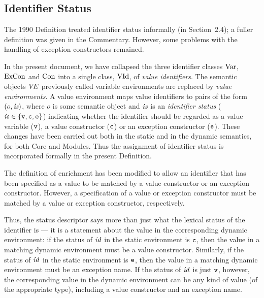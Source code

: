 \subsection{Identifier Status}
%
The 1990 Definition treated identifier status informally (in Section~2.4);
a fuller definition was
given in the Commentary\cite[Appendix B]{mt91}. However, some
problems with the handling of exception constructors remained\cite[Sect.~10.3]{kahrs93}.

In the present document, we have collapsed
the three identifier classes ${\rm Var}$, ${\rm ExCon}$ and ${\rm Con}$ into a single
class, ${\rm VId}$, of {\sl value identifiers}. 
The semantic objects $\mbox{$V\!E$}$ previously called variable environments are
replaced by {\sl value environments}.
A value environment maps
value identifiers to pairs of the form $(o,\hbox{\it is})$, where $o$ is some semantic
object and $\hbox{\it is}$ is an {\sl identifier status} ($\hbox{\it is}\in\{\hbox{\tt v},\hbox{\tt c},\hbox{\tt e}\}$)
indicating whether the identifier should be regarded as a value variable
($\hbox{\tt v}$), a value constructor ($\hbox{\tt c}$) or an exception constructor ($\hbox{\tt e}$).
These changes have been carried out both in the static and in the dynamic
semantics, for both Core and Modules. Thus the assignment of identifier
status is incorporated formally in the present Definition.

The definition of enrichment has been modified to allow an
identifier that has been specified as a value to be matched by a
value constructor or an exception constructor.
However, a
specification of a value or exception constructor must be matched by
a value or exception constructor, respectively.

Thus, the status descriptor says more than just what the lexical
status of the identifier is --- it is  a statement about the
value in the corresponding dynamic  environment: if the
status of ${\it id}$ in the static environment is $\hbox{\tt c}$, then the value
in a matching dynamic  environment must be a value
constructor. Similarly,  if the status of ${\it id}$ in the static environment 
is $\hbox{\tt e}$, then the value
in a matching dynamic  environment must be an exception name. 
If the status of ${\it id}$ is just $\hbox{\tt v}$, however, the corresponding
value in the dynamic environment can be any kind of value (of the appropriate
type), including
a value constructor and an exception name.

